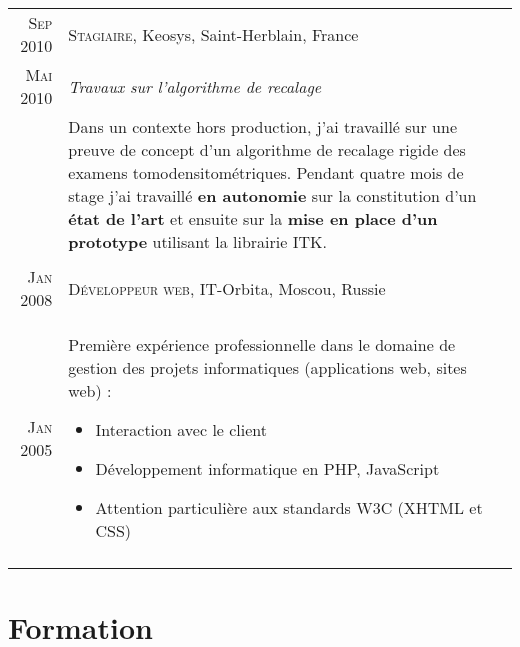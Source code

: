 \documentclass[letter,10pt]{article} %
\begin{document}
\begin{tabular}{r|p{13.5cm}}
\textsc{Sep 2010} & \textsc{Stagiaire}, Keosys, Saint-Herblain, France \\
\textsc{Mai 2010} & \emph{Travaux sur l'algorithme de recalage}  \\
& \vspace{-1mm} Dans un contexte hors production, j'ai travaill\'{e} sur une preuve de concept d'un algorithme de recalage rigide des examens tomodensitom\'{e}triques. Pendant quatre mois de stage j'ai travaill\'{e} \textbf{en autonomie} sur la constitution d'un \textbf{\'{e}tat de l'art} et ensuite sur la \textbf{mise en place d'un prototype} utilisant la librairie ITK.  \\
\multicolumn{2}{c}{} \\

\textsc{Jan 2008} & \textsc{D\'{e}veloppeur web}, IT-Orbita, Moscou, Russie \\
\textsc{Jan 2005} & \vspace{-1mm}Premi\`{e}re exp\'{e}rience professionnelle dans le domaine de gestion des projets informatiques (applications web, sites web) : 
\begin{itemize}
\item Interaction avec le client 
\item D\'{e}veloppement informatique en PHP, JavaScript
\item Attention particuli\`{e}re aux standards W3C (XHTML et CSS)
\end{itemize}\\
\multicolumn{2}{c}{} \\


\end{tabular}

\newpage

\section{Formation}
\end{document}
